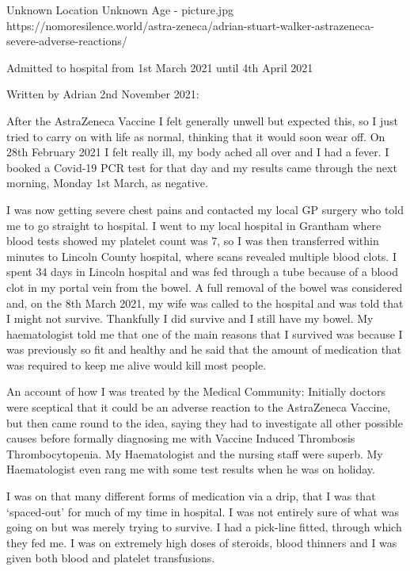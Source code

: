 {Unknown Location}
{Unknown Age}
{}
{}
{-}
{picture.jpg}
{https://nomoresilence.world/astra-zeneca/adrian-stuart-walker-astrazeneca-severe-adverse-reactions/}
{

\normalsize
Admitted to hospital from 1st March 2021 until 4th April 2021

Written by Adrian 2nd November 2021:

After the AstraZeneca Vaccine I felt generally unwell but expected this, so I just tried to carry on with life as normal, thinking that it would soon wear off. On 28th February 2021 I felt really ill, my body ached all over and I had a fever. I booked a Covid-19 PCR test for that day and my results came through the next morning, Monday 1st March, as negative.

I was now getting severe chest pains and contacted my local GP surgery who told me to go straight to hospital. I went to my local hospital in Grantham where blood tests showed my platelet count was 7, so I was then transferred within minutes to Lincoln County hospital, where scans revealed multiple blood clots. I spent 34 days in Lincoln hospital and was fed through a tube because of a blood clot in my portal vein from the bowel. A full removal of the bowel was considered and, on the 8th March 2021, my wife was called to the hospital and was told that I might not survive. Thankfully I did survive and I still have my bowel. My haematologist told me that one of the main reasons that I survived was because I was previously so fit and healthy and he said that the amount of medication that was required to keep me alive would kill most people.

An account of how I was treated by the Medical Community: Initially doctors were sceptical that it could be an adverse reaction to the AstraZeneca Vaccine, but then came round to the idea, saying they had to investigate all other possible causes before formally diagnosing me with Vaccine Induced Thrombosis Thrombocytopenia. My Haematologist and the nursing staff were superb. My Haematologist even rang me with some test results when he was on holiday.

I was on that many different forms of medication via a drip, that I was that ‘spaced-out’ for much of my time in hospital. I was not entirely sure of what was going on but was merely trying to survive. I had a pick-line fitted, through which they fed me. I was on extremely high doses of steroids, blood thinners and I was given both blood and platelet transfusions.

}
